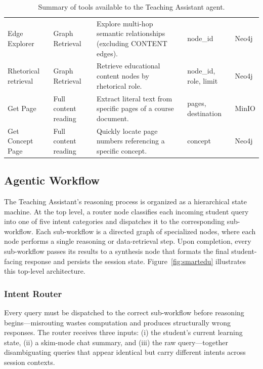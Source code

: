 \begin{table}[H]
{\begin{tabular}{@{}llp{6.5cm}ll@{}}
        Edge Explorer & Graph Retrieval & Explore multi-hop semantic relationships (excluding CONTENT edges). &  {node\_id} & Neo4j \\
        Rhetorical retrieval & Graph Retrieval & Retrieve educational content nodes by rhetorical role. &  {node\_id},  {role},  {limit} & Neo4j \\
        Get Page & Full content reading & Extract literal text from specific pages of a course document. &  {pages},  {destination} & MinIO \\
        Get Concept Page & Full content reading & Quickly locate page numbers referencing a specific concept. &  {concept} & Neo4j \\
        \bottomrule
    \end{tabular}
    }
    \caption{Summary of tools available to the Teaching Assistant agent.}
    \label{tab:agent_tools}
\end{table}

\newpage
\subsection{Agentic Workflow}

The Teaching Assistant's reasoning process is organized as a hierarchical state machine. At the top level, a router node classifies each incoming student query into 
one of five intent categories and dispatches it to the corresponding sub-workflow. Each sub-workflow is a directed graph of specialized nodes, where each node performs a single reasoning or data-retrieval step. Upon completion, every sub-workflow passes its results to a synthesis node that formats the final student-facing response and persists the session state. Figure~\ref{fig:smartedu} illustrates this top-level architecture.



\subsubsection{Intent Router}

Every query must be dispatched to the correct sub-workflow before reasoning begins---misrouting wastes computation and produces structurally wrong responses. 
The router receives three inputs: (i) the student's current learning state, (ii) a  {skim}-mode chat summary, and (iii) the raw query---together disambiguating queries that appear identical but carry different intents across session contexts.

